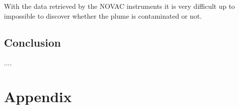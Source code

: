 \documentclass  [
  paper    = a4,
  BCOR     = 10mm,
  twoside,
  fontsize = 12pt,
  fleqn,
  toc      = bibnumbered,
  toc      = listofnumbered,
  numbers  = noendperiod,
  headings = normal,
  listof   = leveldown,
  version  = 3.03
]                                       {scrreprt}
\begin{document}
	  With the data retrieved by the NOVAC instruments it is very difficult up to impossible to discover whether the plume is contaminated or not. 




	\chapter{Conclusion}
	....
	
	
	



  \part{Appendix}
  \begin{appendix}
	\begin{figure}

\end{figure}
\end{appendix}
\end{document}
